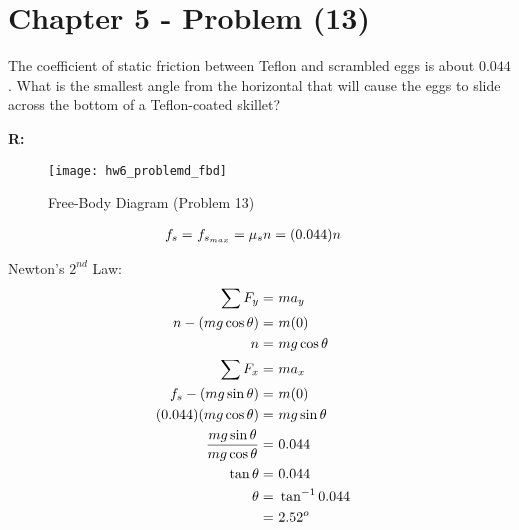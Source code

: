 \section{Chapter 5 - Problem (13)}
	The coefficient of static friction between Teflon and scrambled eggs is about $0.044$. What is the smallest angle from the horizontal that will cause the eggs to slide across the bottom of a Teflon-coated skillet?

	\textbf{R:} \newline

	\begin{figure}[H]
		\begin{center}
			\texttt{[image: hw6\_problemd\_fbd]}
			\caption{Free-Body Diagram (Problem 13)}
			\label{fig:hw6_problemd_fbd}
		\end{center}
	\end{figure}

	\begin{align}
		f_{s} = \ &f_{s_{max}} = \mu_{s}n = (0.044)n& \notag
	\end{align}

	Newton's $2^{nd}$ Law:
	\begin{align}
		\sum F_{y} = \ &ma_{y}& \notag \\
		n - (mg \cos \theta) = \ &m(0)& \notag \\
		n = \ &mg \cos \theta& \notag \\
		\sum F_{x} = \ &ma_{x}& \notag \\
		f_{s} - (mg \sin \theta) = \ &m(0)& \notag \\
		(0.044)(mg \cos \theta) = \ &mg \sin \theta& \notag \\
		\frac{mg \sin \theta}{mg \cos \theta} = \ &0.044& \notag \\
		\tan \theta = \ &0.044& \notag \\
		\theta = \ &\tan^{-1} 0.044& \notag \\
		= \ &2.52^{o}&
	\end{align}
